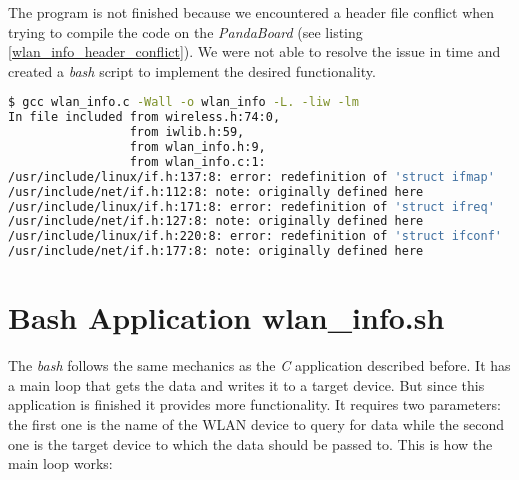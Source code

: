 The program is not finished because we encountered a header file conflict when trying to compile the code on the \textit{PandaBoard} (see listing \ref{wlan_info_header_conflict}). We were not able to resolve the issue in time and created a \textit{bash} script to implement the desired functionality.

\begin{lstlisting}[language=bash, caption=Header conflict, label=wlan_info_header_conflict]
$ gcc wlan_info.c -Wall -o wlan_info -L. -liw -lm
In file included from wireless.h:74:0,
                 from iwlib.h:59,
                 from wlan_info.h:9,
                 from wlan_info.c:1:
/usr/include/linux/if.h:137:8: error: redefinition of 'struct ifmap'
/usr/include/net/if.h:112:8: note: originally defined here
/usr/include/linux/if.h:171:8: error: redefinition of 'struct ifreq'
/usr/include/net/if.h:127:8: note: originally defined here
/usr/include/linux/if.h:220:8: error: redefinition of 'struct ifconf'
/usr/include/net/if.h:177:8: note: originally defined here
\end{lstlisting}


\section{Bash Application wlan\_info.sh}

The \textit{bash} follows the same mechanics as the \textit{C} application described before. It has a main loop that gets the data and writes it to a target device. But since this application is finished it provides more functionality. It requires two parameters: the first one is the name of the WLAN device to query for data while the second one is the target device to which the data should be passed to. This is how the main loop works:

